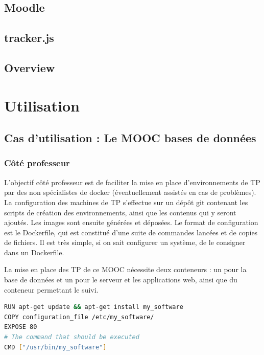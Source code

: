 \documentclass[a4paper,11pt]{report}
\begin{document}
\section{Moodle}

\section{tracker.js}

\section{Overview}

\pagestyle{fancy}

\chapter{Utilisation}

\pagestyle{fancy}

\section{Cas d'utilisation : Le MOOC bases de données}

\subsection{Côté professeur}

L'objectif côté professeur est de faciliter la mise en place d'environnements de TP par des non spécialistes de docker (éventuellement assistés en cas de problèmes).
La configuration des machines de TP s'effectue sur un dépôt git contenant les scripts de création des environnements, ainsi que les contenus qui y seront ajoutés. Les images sont ensuite générées et déposées.
Le format de configuration est le Dockerfile, qui est constitué d'une suite de commandes lancées et de copies de fichiers. Il est très simple, si on sait configurer un système, de le consigner dans un Dockerfile.

La mise en place des TP de ce MOOC nécessite deux conteneurs : un pour la base de données et un pour le serveur et les applications web, ainsi que du conteneur permettant le suivi.

\begin{lstlisting}[language=Bash,caption={Dockerfile de base}]
RUN apt-get update && apt-get install my_software
COPY configuration_file /etc/my_software/
EXPOSE 80
# The command that should be executed
CMD ["/usr/bin/my_software"]
\end{lstlisting}
\end{document}
